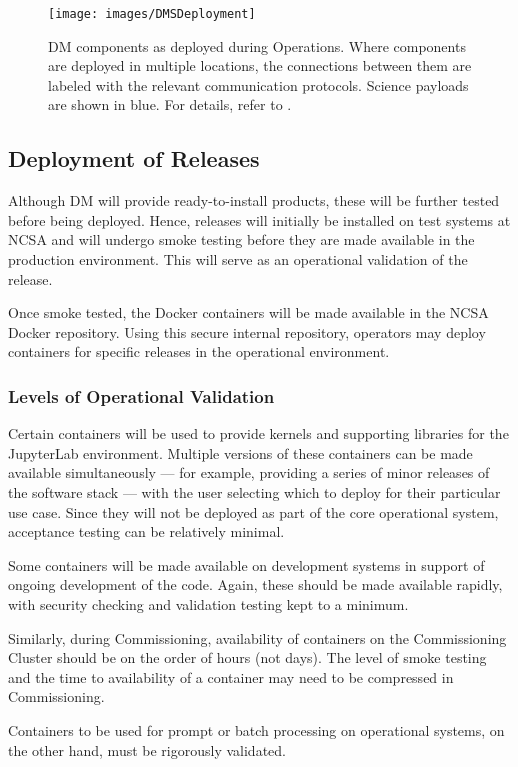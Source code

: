 \begin{figure}[htbp]
        \begin{center}
                \texttt{[image: images/DMSDeployment]}
                \caption{DM components as deployed during Operations.
                         Where components are deployed in multiple locations, the connections between them are labeled with the relevant communication protocols.
                         Science payloads are shown in blue.
                         For details, refer to .
                \label{fig:dmsdeploy}}
        \end{center}
\end{figure}

\subsection{Deployment of Releases}\label{sect:reldep}

Although DM will provide ready-to-install products, these will be further tested before being deployed.
Hence, releases will initially be installed on test systems at NCSA and will undergo smoke testing before they are made available in the production environment.
This will serve as an operational validation of the release.

Once smoke tested, the Docker containers will be made available in the NCSA Docker repository.
Using this secure internal repository, operators may deploy containers for specific releases in the operational environment.

\subsubsection{Levels of Operational Validation}

Certain containers will be used to provide kernels and supporting libraries for the JupyterLab environment.
Multiple versions of these containers can be made available simultaneously --- for example, providing a series of minor releases of the software stack --- with the user selecting which to deploy for their particular use case.
Since they will not be deployed as part of the core operational system, acceptance testing can be relatively minimal.

Some containers will be made available on development systems in support of ongoing development of the code.
Again, these should be made available rapidly, with security checking and validation testing kept to a minimum.

Similarly, during Commissioning, availability of containers on the Commissioning Cluster should be on the order of hours (not days).
The level of smoke testing and the time to availability of a container may need to be compressed in Commissioning.

Containers to be used for prompt or batch processing on operational systems, on the other hand, must be rigorously validated.
